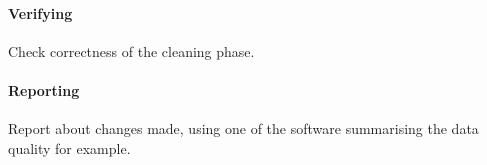 \paragraph{Verifying}
Check correctness of the cleaning phase.
\paragraph{Reporting} 
Report about changes made, using one of the software summarising the data quality for 
example.
